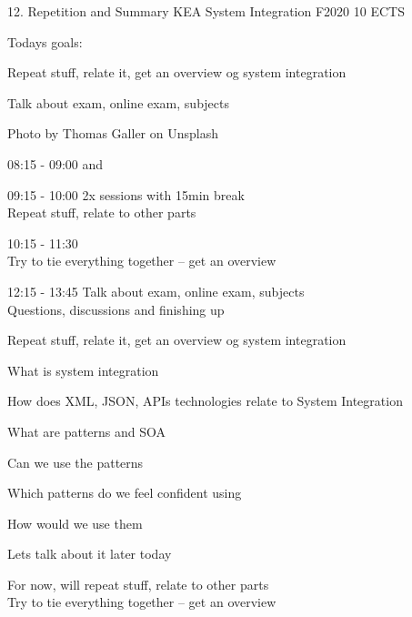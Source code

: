 \documentclass[Screen16to9,17pt]{foils}
\begin{document}
\mytitlepage
{12. Repetition and Summary}
{KEA System Integration F2020 10 ECTS}




Todays goals:
\begin{list2}
\item Repeat stuff, relate it, get an overview og system integration
\item Talk about exam, online exam, subjects
\end{list2}

Photo by Thomas Galler on Unsplash



\begin{list2}
\item 08:15 - 09:00 and
\item 09:15 - 10:00
2x sessions with 15min break\\
Repeat stuff, relate to other parts\\
\item 10:15 - 11:30 \\
Try to tie everything together -- get an overview
\item 12:15 - 13:45
Talk about exam, online exam, subjects\\
Questions, discussions and finishing up
\end{list2}





\begin{list2}
\item Repeat stuff, relate it, get an overview og system integration
\item What is system integration
\item How does XML, JSON, APIs technologies relate to System Integration
\item What are patterns and SOA
\item Can we use the patterns
\item Which patterns do we feel confident using
\item How would we use them
\end{list2}





Lets talk about it later today

For now, will repeat stuff, relate to other parts\\
Try to tie everything together -- get an overview
\end{document}
